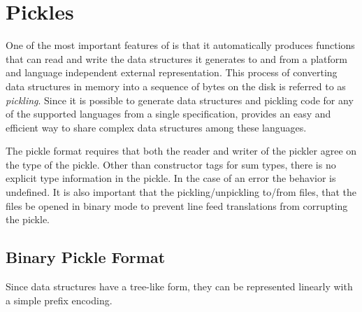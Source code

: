 %
\chapter{Pickles}
\label{chap:pickles}

One of the most important features of \asdlgen{} is that it automatically
produces functions that can read and write the data structures it generates
to and from a platform and language independent external
representation.
This process of converting data structures in memory into a
sequence of bytes on the disk is referred to as \emph{pickling}.
Since it is possible to generate data structures and pickling code for
any of the supported languages from a single \asdl{} specification,
\asdlgen{} provides an easy
and efficient way to share complex data structures among these languages.

The \asdl{} pickle format requires that both the reader and writer
of the pickler agree on the type of the pickle.
Other than constructor tags for sum types, there is no explicit type
information in the pickle.
In the case of an error the behavior is undefined.
It is also important that the pickling/unpickling to/from files, that the
files be opened in binary mode to prevent line feed translations from corrupting
the pickle.

\section{Binary Pickle Format}

Since \asdl{} data structures have a tree-like form, they can be represented
linearly with a simple prefix encoding.

